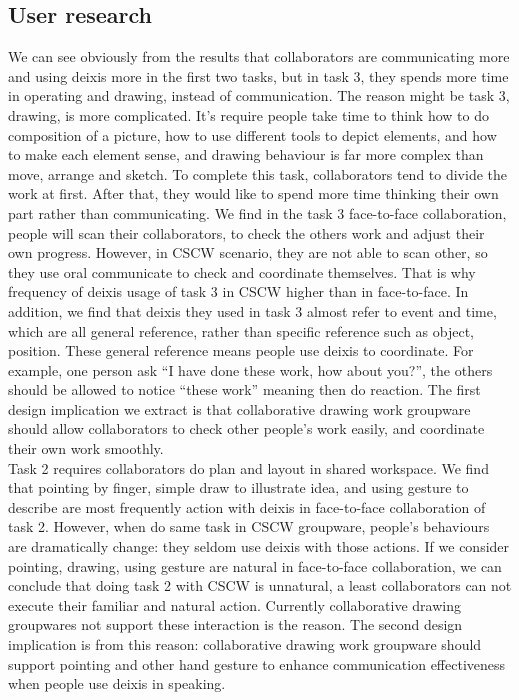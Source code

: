 \documentclass[12pt,twoside]{article}
\begin{document}
\subsection{User research}
We can see obviously from the results that collaborators are communicating more and using deixis more in the first two tasks, but in task 3, they spends more time in operating and drawing, instead of communication. The reason might be task 3, drawing, is more complicated. It’s require people take time to think how to do composition of a picture, how to use different tools to depict elements, and how to make each element sense, and drawing behaviour is far more complex than move, arrange and sketch. To complete this task, collaborators tend to divide the work at first. After that, they would like to spend more time thinking their own part rather than communicating. We find in the task 3 face-to-face collaboration, people will scan their collaborators, to check the others work and adjust their own progress. However, in CSCW scenario, they are not able to scan other, so they use oral communicate to check and coordinate themselves. That is why frequency of deixis usage of task 3 in CSCW higher than in face-to-face.  In addition, we find that deixis they used in task 3 almost refer to event and time, which are all general reference, rather than specific reference such as object, position. These general reference means people use deixis to coordinate. For example, one person ask “I have done these work, how about you?”, the others should be allowed to notice “these work” meaning then do reaction. The first design implication we extract is that collaborative drawing work groupware should allow collaborators to check other people’s work easily, and coordinate their own work smoothly.\\   
Task 2 requires collaborators do plan and layout in shared workspace. We find that pointing by finger, simple draw to illustrate idea, and using gesture to describe are most frequently action with deixis in face-to-face collaboration of task 2. However, when do same task in CSCW groupware, people’s behaviours are dramatically change: they seldom use deixis with those actions. If we consider pointing, drawing, using gesture are natural in face-to-face collaboration, we can conclude that doing task 2 with CSCW is unnatural, a least collaborators can not execute their familiar and natural action. Currently collaborative drawing groupwares not support these interaction is the reason. The second design implication is from this reason: collaborative drawing work groupware should  support pointing and other hand gesture to enhance communication effectiveness when people use deixis in speaking.\\
\end{document}
